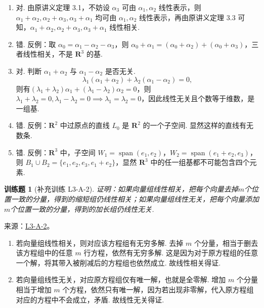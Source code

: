 \documentclass[12pt,fontset=fandol]{ctexart}
\newtheorem{exercise}{训练题}[section]
\begin{document}
\begin{solve}
\begin{enumerate}
                \item 对. 由原讲义定理 3.1，不妨设 $\alpha_3$ 可由 $\alpha_1,\alpha_2$ 线性表示，则 $\alpha_1+\alpha_2,\alpha_2+\alpha_3,\alpha_3+\alpha_1$ 均可由 $\alpha_1,\alpha_2$ 线性表示，再由原讲义定理 3.3 可知，$\alpha_1+\alpha_2,\alpha_2+\alpha_3,\alpha_3+\alpha_1$ 线性相关.

                \item 错. 反例：取 $\alpha_0=\alpha_1-\alpha_2-\alpha_3$，则 $\alpha_0+\alpha_1=(\alpha_0+\alpha_2)+(\alpha_0+\alpha_3)$，三者线性相关，不是 $\mathbf{R}^3$ 的基.

                \item 对. 判断 $\alpha_1+\alpha_2$ 与 $\alpha_1-\alpha_2$ 是否无关.
                    \[\lambda_1(\alpha_1+\alpha_2)+\lambda_2(\alpha_1-\alpha_2)=0,\]
                    则有$(\lambda_1+\lambda_2)\alpha_1+(\lambda_1-\lambda_2)\alpha_2=0$，则 $\lambda_1+\lambda_2=0,\lambda_1-\lambda_2=0\implies \lambda_1=\lambda_2=0$，因此线性无关且个数等于维数，是一组基.

                \item 错. 反例：$\mathbf{R}^2$ 中过原点的直线 $L_0$ 是 $\mathbf{R}^2$ 的一个子空间. 显然这样的直线有无数条.

                \item 错. 反例：$\mathbf{R}^3$ 中，子空间 $W_1=\operatorname{span}(e_1,e_2)$，$W_2=\operatorname{span}(e_1+e_2,e_3)$，则 $B_1\cup B_2=\{e_1,e_2,e_3,e_1+e_2\}$，显然 $\mathbf{R}^3$ 中的任一组基都不可能包含四个元素.
            \end{enumerate}
\end{solve}

\begin{exercise}[补充训练 L3-A-2]\label{prob:L3-A-2}
证明：如果向量组线性相关，把每个向量去掉$m$个位置一致的分量，得到的缩短组仍线性相关；如果向量组线性无关，把每个向量添加$m$个位置一致的分量，得到的加长组仍线性无关.
\end{exercise}
\noindent 来源：\href{https://github.com/yhwu-is/Linear-Algebra-Left-Undone/blob/new/%E8%AE%B2%E4%B9%89/%E4%B8%93%E9%A2%98/3%20%E6%9C%89%E9%99%90%E7%BB%B4%E7%BA%BF%E6%80%A7%E7%A9%BA%E9%97%B4.tex}{L3-A-2}。
\begin{solve}
\begin{enumerate}
                \item 若向量组线性相关，则对应该方程组有无穷多解. 去掉 $m$ 个分量，相当于删去该方程组中的任意 $m$ 行方程，依然有无穷多解. 这是因为对于原方程组的任意一个解，将其带入被削减后的方程组也依然成立. 故线性相关得证.

                \item 若向量组线性无关，对应原方程组仅有唯一解，也就是全零解. 增加 $m$ 个分量相当于增加 $m$ 个方程，依然只有唯一解，因为若出现非零解，代入原方程组对应的方程中不会成立，矛盾. 故线性无关得证.
            \end{enumerate}
\end{solve}
\end{document}
